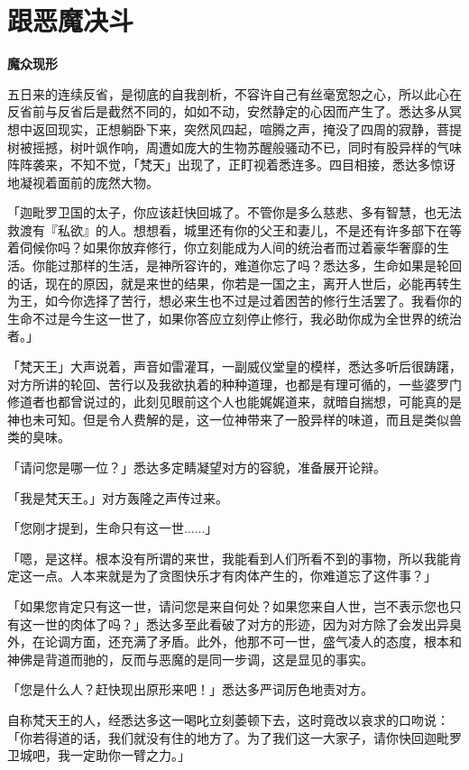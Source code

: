 \documentclass[twoside,openany]{book}
\newcommand{\mt}[1]{\textbullet \textbf{#1}}
\begin{document}
\section{跟恶魔决斗}\label{sec1.15}

\mt{魔众现形}

五日来的连续反省，是彻底的自我剖析，不容许自己有丝毫宽恕之心，所以此心在反省前与反省后是截然不同的，如如不动，安然静定的心因而产生了。悉达多从冥想中返回现实，正想躺卧下来，突然风四起，喧腾之声，掩没了四周的寂静，菩提树被摇撼，树叶飒作响，周遭如庞大的生物苏醒般骚动不已，同时有股异样的气味阵阵袭来，不知不觉，「梵天」出现了，正盯视着悉连多。四目相接，悉达多惊讶地凝视着面前的庞然大物。

「迦毗罗卫国的太子，你应该赶快回城了。不管你是多么慈悲、多有智慧，也无法救渡有『私欲』的人。想想看，城里还有你的父王和妻儿，不是还有许多部下在等着伺候你吗？如果你放弃修行，你立刻能成为人间的统治者而过着豪华奢靡的生活。你能过那样的生活，是神所容许的，难道你忘了吗？悉达多，生命如果是轮回的话，现在的原因，就是来世的结果，你若是一国之主，离开人世后，必能再转生为王，如今你选择了苦行，想必来生也不过是过着困苦的修行生活罢了。我看你的生命不过是今生这一世了，如果你答应立刻停止修行，我必助你成为全世界的统治者。」

「梵天王」大声说着，声音如雷灌耳，一副威仪堂皇的模样，悉达多听后很踌躇，对方所讲的轮回、苦行以及我欲执着的种种道理，也都是有理可循的，一些婆罗门修道者也都曾说过的，此刻见眼前这个人也能娓娓道来，就暗自揣想，可能真的是神也未可知。但是令人费解的是，这一位神带来了一股异样的味道，而且是类似兽类的臭味。

「请问您是哪一位？」悉达多定睛凝望对方的容貌，准备展开论辩。

「我是梵天王。」对方轰隆之声传过来。

「您刚才提到，生命只有这一世......」

「嗯，是这样。根本没有所谓的来世，我能看到人们所看不到的事物，所以我能肯定这一点。人本来就是为了贪图快乐才有肉体产生的，你难道忘了这件事？」

「如果您肯定只有这一世，请问您是来自何处？如果您来自人世，岂不表示您也只有这一世的肉体了吗？」悉达多至此看破了对方的形迹，因为对方除了会发出异臭外，在论调方面，还充满了矛盾。此外，他那不可一世，盛气凌人的态度，根本和神佛是背道而驰的，反而与恶魔的是同一步调，这是显见的事实。

「您是什么人？赶快现出原形来吧！」悉达多严词厉色地责对方。

自称梵天王的人，经悉达多这一喝叱立刻萎顿下去，这时竟改以哀求的口吻说：「你若得道的话，我们就没有住的地方了。为了我们这一大家子，请你快回迦毗罗卫城吧，我一定助你一臂之力。」
\end{document}
